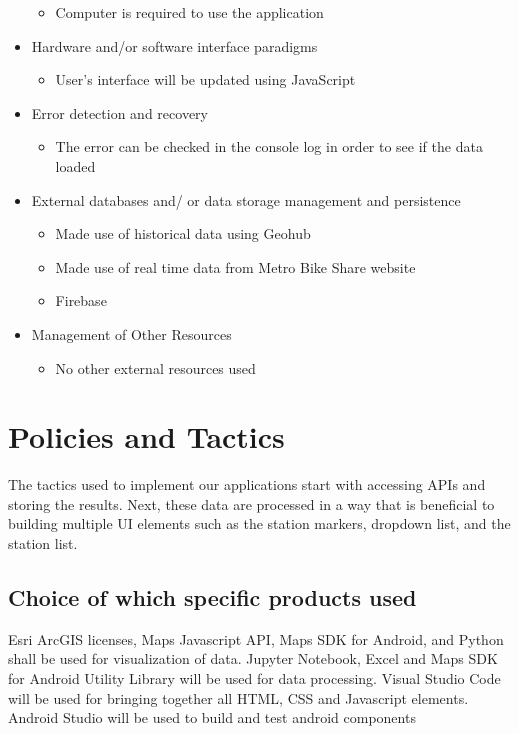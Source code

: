 \documentclass[a4paper,12pt]{article}
\begin{document}
\begin{itemize}
\begin{itemize}
            \item Computer is required to use the application
        \end{itemize}
    \item Hardware and/or software interface paradigms
        \begin{itemize}
            \item User’s interface will be updated using JavaScript
        \end{itemize}
    \item Error detection and recovery
        \begin{itemize}
            \item The error can be checked in the console log in order to see if the data loaded
        \end{itemize}
    \item External databases and/ or data storage management and persistence
        \begin{itemize}
            \item Made use of historical data using Geohub
            \item Made use of real time data from Metro Bike Share website
            \item Firebase
        \end{itemize}
    \item Management of Other Resources
        \begin{itemize}
            \item No other external resources used
        \end{itemize}
\end{itemize}
\section{Policies and Tactics}
The tactics used to implement our applications start with accessing APIs and storing the results.
Next, these data are processed in a way that is beneficial to building multiple UI elements such as
the station markers, dropdown list, and the station list.
\subsection{Choice of which specific products used}
Esri ArcGIS licenses, Maps Javascript API, Maps SDK for Android, and Python shall be used
for visualization of data. Jupyter Notebook, Excel and Maps SDK for Android Utility Library
will be used for data processing. Visual Studio Code will be used for bringing together all
HTML, CSS and Javascript elements. Android Studio will be used to build and test android
components
\end{document}
